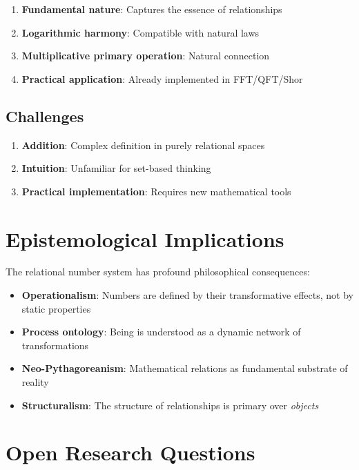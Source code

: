 \documentclass[11pt,a4paper]{article}
\begin{document}
	\begin{enumerate}
		\item \textbf{Fundamental nature}: Captures the essence of relationships
		\item \textbf{Logarithmic harmony}: Compatible with natural laws
		\item \textbf{Multiplicative primary operation}: Natural connection
		\item \textbf{Practical application}: Already implemented in FFT/QFT/Shor
	\end{enumerate}
	
	\subsection{Challenges}
	
	\begin{enumerate}
		\item \textbf{Addition}: Complex definition in purely relational spaces
		\item \textbf{Intuition}: Unfamiliar for set-based thinking
		\item \textbf{Practical implementation}: Requires new mathematical tools
	\end{enumerate}
	
	\section{Epistemological Implications}
	
	The relational number system has profound philosophical consequences:
	
	\begin{itemize}
		\item \textbf{Operationalism}: Numbers are defined by their transformative effects, not by static properties
		\item \textbf{Process ontology}: Being is understood as a dynamic network of transformations
		\item \textbf{Neo-Pythagoreanism}: Mathematical relations as fundamental substrate of reality
		\item \textbf{Structuralism}: The structure of relationships is primary over \emph{objects}
	\end{itemize}
	
	\section{Open Research Questions}
	
\end{document}
